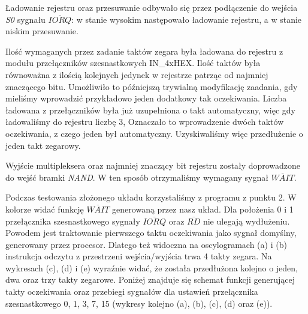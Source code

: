 \documentclass[fleqn]{article}
\newcommand\square[1]{
	\fcolorbox{black}{#1}{\rule{0pt}{6pt}\rule{6pt}{0pt}}
}
\begin{document}
Ładowanie rejestru oraz przesuwanie odbywało się przez podłączenie do wejścia \textit{S0} sygnału $\overline{IORQ}$: w stanie wysokim następowało ładowanie rejestru, a w stanie niskim przesuwanie.

Ilość wymaganych przez zadanie taktów zegara była ładowana do rejestru z modułu przełączników szesnastkowych IN\_4xHEX. Ilość taktów była równoważna z ilością kolejnych jedynek w rejestrze patrząc od najmniej znaczącego bitu. Umożliwiło to późniejszą trywialną modyfikację zaadania, gdy mieliśmy wprowadzić przykładowo jeden dodatkowy tak oczekiwania. Liczba ładowana z przełączników była już uzupełniona o takt automatyczny, więc gdy ładowaliśmy do rejestru liczbę 3, Oznaczało to wprowadzenie dwóch taktów oczekiwania, z czego jeden był automatyczny. Uzyskiwaliśmy więc przedłużenie o jeden takt zegarowy.

Wyjście multipleksera oraz najmniej znaczący bit rejestru zostały doprowadzone do wejść bramki \textit{NAND}. W ten sposób otrzymaliśmy wymagany sygnał $\overline{WAIT}$.

Podczas testowania złożonego układu korzystaliśmy z programu z punktu 2.  W kolorze \square{blue} widać funkcję $\overline{WAIT}$ generowaną przez nasz układ. Dla położenia 0 i 1 przełącznika szesnastkowego sygnały $\overline{IORQ}$ oraz $\overline{RD}$ nie ulegają wydłużeniu. Powodem jest traktowanie pierwszego taktu oczekiwania jako sygnał domyślny, generowany przez procesor. Dlatego też widoczna na oscylogramach (a) i (b) instrukcja odczytu z przestrzeni wejścia/wyjścia trwa 4 takty zegara. Na wykresach (c), (d) i (e) wyraźnie widać, że została przedłużona kolejno o jeden, dwa oraz trzy takty zegarowe. Poniżej znajduje się schemat funkcji generującej takty oczekiwania oraz przebiegi sygnałów dla ustawień przełącznika szesnastkowego 0, 1, 3, 7, 15 (wykresy kolejno (a), (b), (c), (d) oraz (e)).
\end{document}

